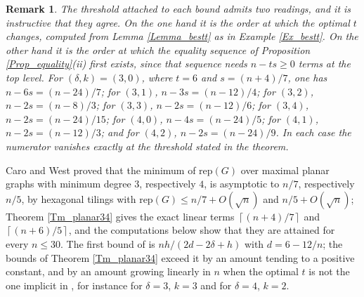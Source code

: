 \documentclass[10pt,a4paper]{article}
\newtheorem{remark}[theorem]{Remark}
\begin{document}
\begin{remark}
\label{Rem_thresholds}The threshold attached to each bound admits two
readings, and it is instructive that they agree. On the one hand it is the
order at which the optimal $t$ changes, computed from Lemma \ref{Lemma_bestt} as
in Example \ref{Ex_bestt}. On the other hand it is the order at which the
equality sequence of Proposition \ref{Prop_equality}(ii) first exists, since
that sequence needs $n-ts\geq 0$ terms at the top level. For
$(\delta ,k)=(3,0)$, where $t=6$ and $s=(n+4)/7$, one has $n-6s=(n-24)/7$; for
$(3,1)$, $n-3s=(n-12)/4$; for $(3,2)$, $n-2s=(n-8)/3$; for $(3,3)$,
$n-2s=(n-12)/6$; for $(3,4)$, $n-2s=(n-24)/15$; for $(4,0)$, $n-4s=(n-24)/5$;
for $(4,1)$, $n-2s=(n-12)/3$; and for $(4,2)$, $n-2s=(n-24)/9$. In each case
the numerator vanishes exactly at the threshold stated in the theorem.
\end{remark}



Caro and West \cite[Theorem 2.5]{CaroWest} proved that the minimum of $\mathrm{rep}(G)$ over
maximal planar graphs with minimum degree $3$, respectively $4$, is asymptotic to $n/7$, respectively
$n/5$, by hexagonal tilings with $\mathrm{rep}(G)\leq n/7+O(\sqrt{n})$ and $n/5+O(\sqrt{n})$;
Theorem \ref{Tm_planar34} gives the exact linear terms $\left\lceil (n+4)/7\right\rceil $ and
$\left\lceil (n+6)/5\right\rceil $, and the computations below show that they are attained for every
$n\leq 30$. The first bound of \cite[Theorem 2.1(1)]{CaroLauriZarb} is $nh/(2d-2\delta +h)$ with
$d=6-12/n$; the bounds of Theorem \ref{Tm_planar34} exceed it by an amount tending to a positive
constant, and by an amount growing linearly in $n$ when the optimal $t$ is not the one implicit in
\cite{CaroLauriZarb}, for instance for $\delta =3$, $k=3$ and for $\delta =4$, $k=2$.
\end{document}
